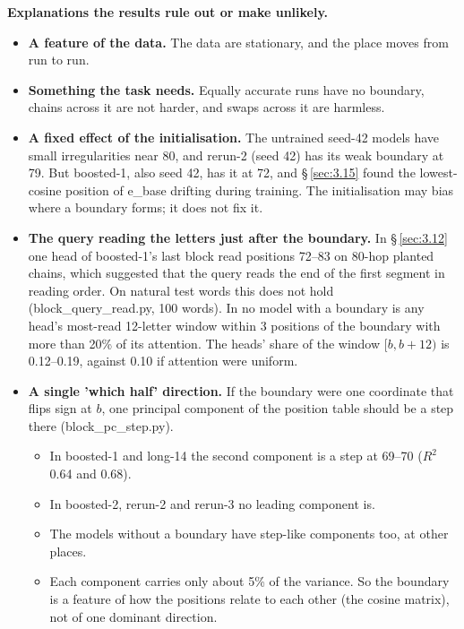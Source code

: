 \documentclass[paper=a4,fontsize=11pt,DIV=11,parskip=half,headings=small,numbers=noendperiod]{scrartcl}
\DeclareRobustCommand{\lead}[1]{\textsf{\bfseries\color{accent}#1}}
\DeclareRobustCommand{\code}[1]{{\fontseries{m}\ttfamily #1}}
\begin{document}
\lead{Explanations the results rule out or make unlikely.}

\begin{itemize}
\item \lead{A feature of the data.} The data are stationary, and the place moves from run to run.
\item \lead{Something the task needs.} Equally accurate runs have no boundary, chains across it are not harder,
  and swaps across it are harmless.
\item \lead{A fixed effect of the initialisation.} The untrained seed-42 models have small irregularities near
  80, and \code{rerun-\allowbreak{}2} (seed 42) has its weak boundary at 79. But \code{boosted-\allowbreak{}1},
  also seed 42, has it at 72, and \S\,\ref{sec:3.15} found the lowest-cosine position of
  \code{e\_\allowbreak{}base} drifting during training. The initialisation may bias where a boundary forms; it
  does not fix it.
\item \lead{The query reading the letters just after the boundary.} In \S\,\ref{sec:3.12} one head of
  \code{boosted-\allowbreak{}1}’s last block read positions 72–83 on 80-hop planted chains, which suggested that
  the query reads the end of the first segment in reading order. On natural test words this does not hold
  (\code{block\_\allowbreak{}query\_\allowbreak{}read.\allowbreak{}py}, 100 words). In no model with a boundary
  is any head’s most-read 12-letter window within 3 positions of the boundary with more than 20\% of its
  attention. The heads’ share of the window $[b, b+12)$ is 0.12–0.19, against 0.10 if attention were uniform.
\item \lead{A single ’which half’ direction.} If the boundary were one coordinate that flips sign at $b$, one
  principal component of the position table should be a step there
  (\code{block\_\allowbreak{}pc\_\allowbreak{}step.\allowbreak{}py}).
\begin{itemize}
\item In \code{boosted-\allowbreak{}1} and \code{long-\allowbreak{}14} the second component is a step at 69–70
  ($R^2$ 0.64 and 0.68).
\item In \code{boosted-\allowbreak{}2}, \code{rerun-\allowbreak{}2} and \code{rerun-\allowbreak{}3} no leading
  component is.
\item The models without a boundary have step-like components too, at other places.
\item Each component carries only about 5\% of the variance. So the boundary is a feature of how the positions
  relate to each other (the cosine matrix), not of one dominant direction.
\end{itemize}
\end{itemize}
\end{document}
